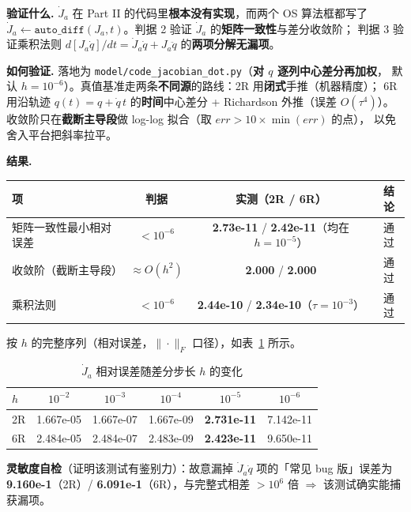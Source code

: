 \documentclass[11pt,a4paper]{ctexart}
\begin{document}
\textbf{验证什么.} $\dot J_a$ 在 Part II 的代码里\textbf{根本没有实现}，而两个 OS 算法框都写了
$\dot J_a\leftarrow\texttt{auto\_diff}(J_a,t)$。判据 2 验证 $\dot J_a$ 的\textbf{矩阵一致性}与差分收敛阶；
判据 3 验证乘积法则 $d[J_a\dot q]/dt=\dot J_a\dot q+J_a\ddot q$ 的\textbf{两项分解无漏项}。

\textbf{如何验证.} 落地为 \texttt{model/code\_jacobian\_dot.py}（\textbf{对 $q$ 逐列中心差分再加权}，
默认 $h=10^{-6}$）。真值基准走两条\textbf{不同源}的路线：2R 用\textbf{闭式}手推（机器精度）；
6R 用沿轨迹 $q(t)=q+\dot q\,t$ 的\textbf{时间}中心差分 + Richardson 外推（误差 $O(\tau^4)$）。
收敛阶只在\textbf{截断主导段}做 log-log 拟合（取 $err>10\times\min(err)$ 的点），
以免舍入平台把斜率拉平。

\textbf{结果.}

\begin{table}[H]
\centering
\small
\begin{tabular}{@{}lccc@{}}
\toprule
项 & 判据 & 实测（2R / 6R） & 结论 \\
\midrule
矩阵一致性最小相对误差 & $<10^{-6}$ & \textbf{2.73e-11} / \textbf{2.42e-11}（均在 $h=10^{-5}$） & 通过 \\
收敛阶（截断主导段） & $\approx O(h^2)$ & \textbf{2.000} / \textbf{2.000} & 通过 \\
乘积法则 & $<10^{-6}$ & \textbf{2.44e-10} / \textbf{2.34e-10}（$\tau=10^{-3}$） & 通过 \\
\bottomrule
\end{tabular}
\end{table}

按 $h$ 的完整序列（相对误差，$\|\cdot\|_F$ 口径），如表~\ref{tab:jdot-h} 所示。

\begin{table}[H]
\centering
\small
\caption{$\dot J_a$ 相对误差随差分步长 $h$ 的变化}\label{tab:jdot-h}
\begin{tabular}{@{}lccccc@{}}
\toprule
$h$ & $10^{-2}$ & $10^{-3}$ & $10^{-4}$ & $10^{-5}$ & $10^{-6}$ \\
\midrule
2R & 1.667e-05 & 1.667e-07 & 1.667e-09 & \textbf{2.731e-11} & 7.142e-11 \\
6R & 2.484e-05 & 2.484e-07 & 2.483e-09 & \textbf{2.423e-11} & 9.650e-11 \\
\bottomrule
\end{tabular}
\end{table}

\textbf{灵敏度自检}（证明该测试有鉴别力）：故意漏掉 $\dot J_a\dot q$ 项的「常见 bug 版」误差为
\textbf{9.160e-1}（2R）/ \textbf{6.091e-1}（6R），与完整式相差 $>10^{6}$ 倍
$\Rightarrow$ 该测试确实能捕获漏项。
\end{document}

